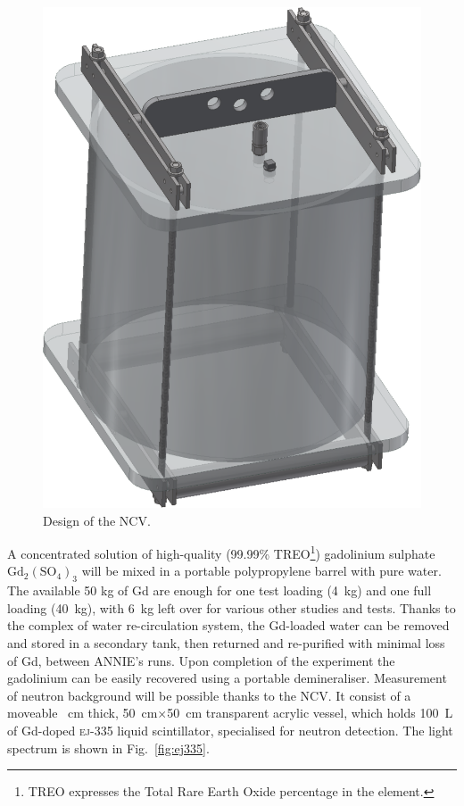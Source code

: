  \begin{figure}
   \centering
   \includegraphics[scale=.15]{pics/ncv}
   \caption{Design of the NCV.}
   \label{fig:ncv}
 \end{figure}

 A concentrated solution of high-quality (99.99\% TREO\footnote{TREO expresses the %
   Total Rare Earth Oxide percentage in the element.}) gadolinium sulphate %
 $\mathrm{Gd}_2(\mathrm{SO}_4)_3$ will be mixed in a portable polypropylene barrel with pure water.
 The available 50 kg of Gd are enough for one test loading (4~kg) and %
 one full loading (40~kg), with 6~kg left over for various other studies and tests.
 Thanks to the complex of water re-circulation system, the Gd-loaded water can be removed %
 and stored in a secondary tank, then returned and re-purified with minimal loss of Gd, %
 between ANNIE's runs.
 Upon completion of the experiment the gadolinium can be easily recovered using a %
 portable demineraliser.
 Measurement of neutron background will be possible thanks to the NCV.
 It consist of a moveable ~cm thick, 50~cm$\times$50~cm transparent acrylic vessel, %
 which holds 100~L of Gd-doped \textsc{ej-335} liquid scintillator, %
 specialised for neutron detection.
 The light spectrum is shown in Fig.~\ref{fig:ej335}.


